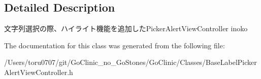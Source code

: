 \subsection{Detailed Description}
文字列選択の際、ハイライト機能を追加したPickerAlertViewController  inoko 

The documentation for this class was generated from the following file:\begin{DoxyCompactItemize}
\item 
/Users/toru0707/git/GoClinic\_\-no\_\-GoStones/GoClinic/Classes/BaseLabelPickerAlertViewController.h\end{DoxyCompactItemize}
